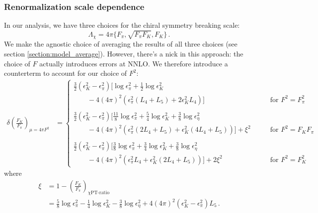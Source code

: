 \documentclass[prd,tightenlines,preprintnumbers,showpacs,superscriptaddress,notitlepage,eqsecnum,floatfix,notitlepage]{revtex4-1}
\begin{document}
\subsubsection{Renormalization scale dependence}
In our analysis, we have three choices for the chiral symmetry breaking scale:
\begin{equation}
\Lambda_\chi  = 4 \pi \{ F_\pi, \sqrt{F_\pi F_K}, F_K\} \, .
\end{equation}
We make the agnostic choice of averaging the results of all three choices (see section \ref{section:model_average}). However, there's a nick in this approach: the choice of $F$ actually introduces errors at NNLO. We therefore introduce a counterterm to account for our choice of $F^2$:
\begin{align}
\delta\left(\frac{F_K}{F_\pi}\right)_{\mu = 4\pi F^2} &=
\begin{cases}
\frac 32 \left( \epsilon^2_K - \epsilon_\pi^2 \right) \big[
\log \epsilon_\pi^2 + \frac 12 \log \epsilon^2_K \\
\qquad - 4 (4\pi)^2 \left( \epsilon_\pi^2 (L_4 + L_5 ) + 2\epsilon_K^2 L_4 \right)
\big] 
&\qquad \text{for $F^2= F_\pi^2$} \\ \\
\frac 32 \left( \epsilon^2_K - \epsilon_\pi^2 \right) \big[
\frac{11}{8} \log \epsilon_\pi^2 + \frac 54 \log \epsilon^2_K + \frac 38 \log \epsilon_\eta^2 \\
\qquad - 4 (4\pi)^2 \left( \epsilon_\pi^2 (2 L_4 + L_5) + \epsilon_K^2 (4 L_4 + L_5) \right)
\big] + \xi^2
&\qquad \text{for $F^2= F_K F_\pi $} \\ \\
\frac 32 \left( \epsilon^2_K - \epsilon_\pi^2 \right) \big[
\frac{3}{8} \log \epsilon_\pi^2 + \frac 34 \log \epsilon^2_K + \frac 38 \log \epsilon_\eta^2 \\
\qquad - 4 (4\pi)^2 \left( \epsilon_\pi^2 L_4 + \epsilon_K^2  (2 L_4 + L_5) \right)
\big] + 2 \xi^2
&\qquad \text{for $F^2= F_K^2$}
\end{cases}
\end{align}
where
\begin{align}
\xi & = 1 - \left(\frac{F_K}{F_\pi}\right)_\text{$\chi$PT-ratio} \\
&=  \frac 58 \log \epsilon_\pi^2 - \frac 14 \log \epsilon_K^2 - \frac 38 \log \epsilon_\eta^2 
+ 4 (4 \pi)^2 \left(\epsilon_K^2 - \epsilon_\pi^2\right) L_5 \, . \nonumber
\end{align}
\end{document}
